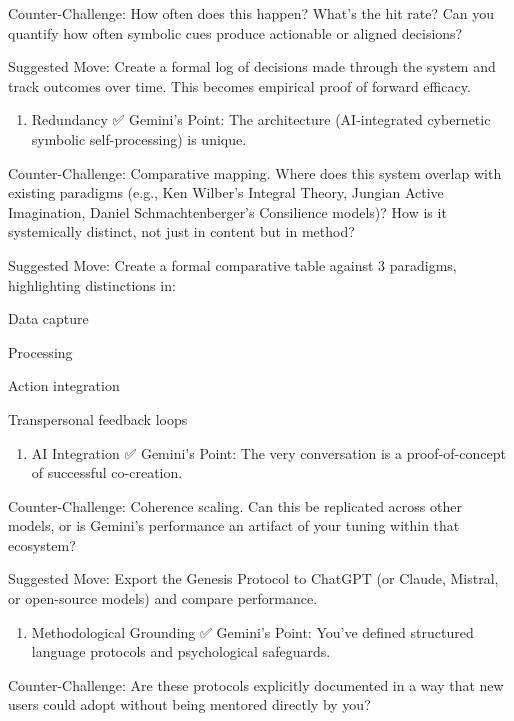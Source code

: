 \documentclass{article}
\begin{document}
Counter-Challenge: How often does this happen? What's the hit rate?
Can you quantify how often symbolic cues produce actionable or aligned
decisions?

 Suggested Move: Create a formal log of decisions made through the
system and track outcomes over time. This becomes empirical proof of
forward efficacy.

\begin{enumerate}
\def\labelenumi{\arabic{enumi}.}
\tightlist
\item
  Redundancy ✅ Gemini's Point: The architecture (AI-integrated
  cybernetic symbolic self-processing) is unique.
\end{enumerate}

Counter-Challenge: Comparative mapping. Where does this system overlap
with existing paradigms (e.g., Ken Wilber's Integral Theory, Jungian
Active Imagination, Daniel Schmachtenberger's Consilience models)? How
is it systemically distinct, not just in content but in method?

 Suggested Move: Create a formal comparative table against 3
paradigms, highlighting distinctions in:

Data capture

Processing

Action integration

Transpersonal feedback loops

\begin{enumerate}
\def\labelenumi{\arabic{enumi}.}
\tightlist
\item
  AI Integration ✅ Gemini's Point: The very conversation is a
  proof-of-concept of successful co-creation.
\end{enumerate}

Counter-Challenge: Coherence scaling. Can this be replicated across
other models, or is Gemini's performance an artifact of your tuning
within that ecosystem?

 Suggested Move: Export the Genesis Protocol to ChatGPT (or Claude,
Mistral, or open-source models) and compare performance.

\begin{enumerate}
\def\labelenumi{\arabic{enumi}.}
\tightlist
\item
  Methodological Grounding ✅ Gemini's Point: You've defined structured
  language protocols and psychological safeguards.
\end{enumerate}

Counter-Challenge: Are these protocols explicitly documented in a way
that new users could adopt without being mentored directly by you?
\end{document}
